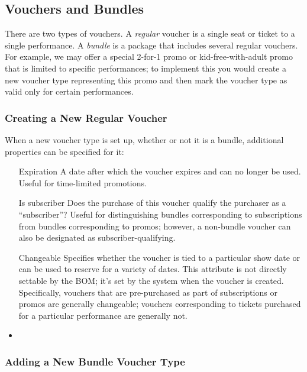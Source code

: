 \subsection{Vouchers and Bundles}
\label{sec:vouchertypes-details}

There are two types of vouchers.  A \emph{regular} voucher is a single
seat or ticket to a single performance.  A \emph{bundle} is a package
that includes several regular vouchers.  For example, we may
offer a special 2-for-1 promo or kid-free-with-adult promo that is
limited to specific performances; to implement this you would create a
new voucher type representing this promo and then mark the voucher type
as valid only for certain performances.

\subsubsection{Creating a New Regular Voucher}
\label{sec:addingregularvouchertypes}


When a new voucher type is set up, whether or not it is a bundle,
additional properties can be specified for it:

\begin{itemize}
\item[Expiration] A date after which the voucher expires and can no
  longer be used.  Useful for time-limited promotions.
\item[Is subscriber] Does the purchase of this voucher qualify the
  purchaser as a ``subscriber''?  Useful for distinguishing bundles
  corresponding to subscriptions from bundles corresponding to promos;
  however, a non-bundle voucher can also be designated as
  subscriber-qualifying. 
\item[Changeable] Specifies whether the voucher is tied to a particular
  show date or can be used to reserve for a variety of dates. This
  attribute is not directly settable by the BOM; it's set by the system
  when the voucher is created.  Specifically, vouchers that are
  pre-purchased as part of subscriptions or promos are generally
  changeable; vouchers corresponding to tickets purchased for a
  particular performance are generally not.
\item
\end{itemize}


\subsubsection{Adding a New Bundle Voucher Type}
\label{sec:addingbundlevouchertypes}


